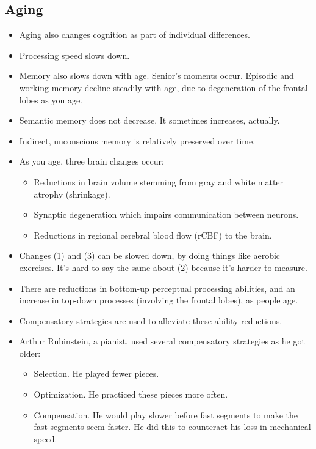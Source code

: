 \documentclass[]{article}
\newcommand{\lecture}[1]{\marginpar{{\footnotesize $\leftarrow$ \underline{#1}}}}
\begin{document}
		\subsection{Aging}
			\begin{itemize}
				\item Aging also changes cognition as part of individual differences.
				\item Processing speed slows down.
				\item Memory also slows down with age. Senior's moments occur. Episodic and working memory decline steadily with age, due to degeneration of the frontal lobes as you age.
				\item Semantic memory does not decrease. It sometimes increases, actually.
				\item Indirect, unconscious memory is relatively preserved over time.
				\item As you age, three brain changes occur:
					\begin{itemize}
						\item Reductions in brain volume stemming from gray and white matter atrophy (shrinkage).
						\item Synaptic degeneration which impairs communication between neurons.
						\item Reductions in regional cerebral blood flow (rCBF) to the brain.
					\end{itemize}
					
				\item Changes (1) and (3) can be slowed down, by doing things like aerobic exercises. It's hard to say the same about (2) because it's harder to measure.
				
				\item There are reductions in bottom-up perceptual processing abilities, and an increase in top-down processes (involving the frontal lobes), as people age. \lecture{April 2, 2013}
				\item Compensatory strategies are used to alleviate these ability reductions.
				\item Arthur Rubinstein, a pianist, used several compensatory strategies as he got older:
					\begin{itemize}
						\item Selection. He played fewer pieces.
						\item Optimization. He practiced these pieces more often.
						\item Compensation. He would play slower before fast segments to make the fast segments seem faster. He did this to counteract his loss in mechanical speed.
					\end{itemize}
					

\end{itemize}
\end{document}
